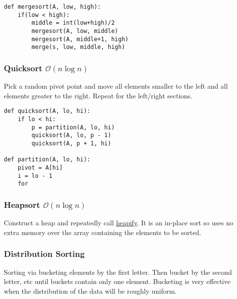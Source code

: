 \documentclass[10pt]{article}
\theoremstyle{definition}
\begin{document}
\begin{lstlisting}
def mergesort(A, low, high):
    if(low < high):
        middle = int(low+high)/2
        mergesort(A, low, middle)
        mergesort(A, middle+1, high)
        merge(s, low, middle, high)
\end{lstlisting}

\subsubsection{Quicksort $\mathcal{O}(n\log n)$}
Pick a random pivot point and move all elements smaller to the left and all elements greater to the right. Repeat for the left/right sections.
\begin{lstlisting}
def quicksort(A, lo, hi):
    if lo < hi:
        p = partition(A, lo, hi)
        quicksort(A, lo, p - 1)
        quicksort(A, p + 1, hi)

def partition(A, lo, hi):
    pivot = A[hi]
    i = lo - 1
    for 
\end{lstlisting}

\subsubsection{Heapsort $\mathcal{O}(n\log n)$}
Construct a heap and repeatedly call \hyperlink{heapify}{heapify}. It is an in-place sort so uses no extra memory over the array containing the elements to be sorted.

\subsubsection{Distribution Sorting}
Sorting via bucketing elements by the first letter. Then bucket by the second letter, etc until buckets contain only one element. Bucketing is very effective when the distribution of the data will be roughly uniform.
\end{document}
